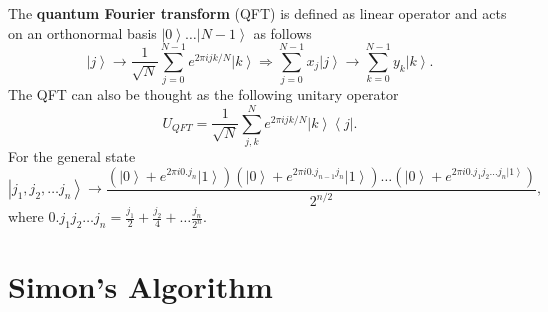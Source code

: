 \documentclass[11pt]{article} %
\newcommand{\bra}[1]{\left\langle #1 \right|}
\newcommand{\ket}[1]{\left|#1\right\rangle}
\begin{document}
The {\bf quantum Fourier transform} (QFT) is defined as linear operator and acts on an orthonormal basis $\ket{0}\ldots \ket{N-1}$ as follows 
\begin{equation}
    \ket{j} \rightarrow \frac{1}{\sqrt{N}}\sum_{j=0}^{N-1} e^{2\pi ijk/N}\ket{k} \Rightarrow \sum_{j=0}^{N-1}x_j\ket{j} \rightarrow \sum_{k=0}^{N-1} y_k\ket{k}.
\end{equation}
The QFT can also be thought as the following unitary operator
\begin{equation}
    U_{QFT}= \frac{1}{\sqrt{N}}\sum_{j,k}^{N}e^{2\pi ijk/N}\ket{k}\bra{j}.
\end{equation}
For the general state 
$$\ket{j_1,j_2,\ldots j_n} \rightarrow \frac{(\ket{0}+e^{2\pi i0.j_n}\ket{1})(\ket{0}+e^{2\pi i0.j_{n-1}j_n}\ket{1})\ldots(\ket{0}+e^{2\pi i0.j_1 j_2 \ldots j_n\ket{1}})}{2^{n/2}},$$ where $0.j_1 j_2 \ldots j_n=\frac{j_1}{2}+\frac{j_2}{4}+\ldots \frac{j_n}{2^n}.$

\section{Simon's Algorithm}
\end{document}
